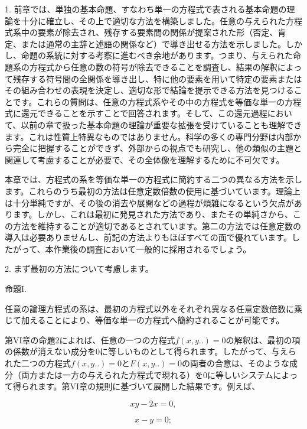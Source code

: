 \documentclass[a4paper,11pt,openany]{ltjsbook}
\begin{document}
1. 前章では、単独の基本命題、すなわち単一の方程式で表される基本命題の理論を十分に確立し、その上で適切な方法を構築しました。任意の与えられた方程式系中の要素が除去され、残存する要素間の関係が提案された形（否定、肯定、または通常の主辞と述語の関係など）で導き出せる方法を示しました。しかし、命題の系統に対する考察に進むべき余地があります。つまり、与えられた命題系の方程式から任意の数の符号が除去できることを調査し、結果の解釈によって残存する符号間の全関係を導き出し、特に他の要素を用いて特定の要素またはその組み合わせの表現を決定し、適切な形で結論を提示できる方法を見つけることです。これらの質問は、任意の方程式系やその中の方程式を等価な単一の方程式に還元できることを示すことで回答されます。そして、この還元過程において、以前の章で扱った基本命題の理論が重要な拡張を受けていることも理解できます。これは性質上特異なものではありません。科学の多くの専門分野は内部から完全に把握することができず、外部からの視点でも研究し、他の類似の主題と関連して考慮することが必要で、その全体像を理解するために不可欠です。

本章では、方程式の系を等価な単一の方程式に簡約する二つの異なる方法を示します。これらのうち最初の方法は任意定数倍数の使用に基づいています。理論上は十分単純ですが、その後の消去や展開などの過程が煩雑になるという欠点があります。しかし、これは最初に発見された方法であり、またその単純さから、この方法を維持することが適切であるとされています。第二の方法では任意定数の導入は必要ありませんし、前記の方法よりもほぼすべての面で優れています。したがって、本作業後の調査において一般的に採用されるでしょう。

2. まず最初の方法について考慮します。

\centering
\textsc{命題I}.

任意の論理方程式の系は、最初の方程式以外をそれぞれ異なる任意定数倍数に乘じて加えることにより、等価な単一の方程式へ簡約されることが可能です。

第VI章の命題2によれば、任意の一つの方程式$f(x, y..) = 0$の解釈は、最初の項の係数が消えない成分を0に等しいものとして得られます。したがって、与えられた二つの方程式$f(x, y..) = 0$と$F(x, y..) = 0$の両者の合意は、そのような成分（両方または一方の与えられた方程式で現れる）を0に等しいシステムによって得られます。第VI章の規則に基づいて展開した結果です。例えば、

\begin{equation}
xy - 2x = 0,
\end{equation}

\begin{equation}
x - y = 0;
\end{equation}
\end{document}
